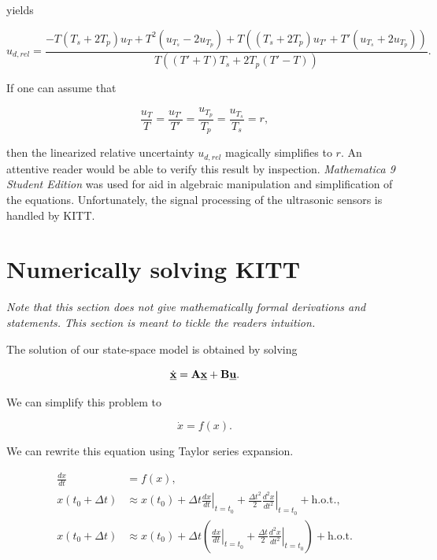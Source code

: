 \documentclass[11pt,titlepage]{report}
\begin{document}
\begin{appendices}
yields

\begin{equation}
	u_{d,rel} = \frac{
		-T(T_s + 2 T_p) u_T + T^2 (u_{T_s} - 2 u_{T_p}) + T \left( (T_s + 2 T_p) u_{T'} + T' (u_{T_s} + 2 u_{T_p}) \right)
	}{
		T \left( (T'+T)T_s + 2 T_p (T'-T) \right)
	}.
\end{equation}

If one can assume that

\begin{equation}
	\frac{u_T}{T} = \frac{u_{T'}}{T'} = \frac{u_{T_p}}{T_p} = \frac{u_{T_s}}{T_s}=r,
\end{equation}

then the linearized relative uncertainty $u_{d,rel}$ magically simplifies to $r$. An attentive reader would be able to verify this result by inspection. \textit{Mathematica 9 Student Edition} was used for aid in algebraic manipulation and simplification of the equations. Unfortunately, the signal processing of the ultrasonic sensors is handled by KITT.

\chapter{Numerically solving KITT}

\textit{Note that this section does not give mathematically formal derivations and statements. This section is meant to tickle the readers intuition.}

The solution of our state-space model is obtained by solving

\begin{equation}
	\dot{\mathbf{\underline{x}}}=\mathbf{A}\mathbf{\underline{x}}+\mathbf{B}\mathbf{\underline{u}}.
\end{equation}

We can simplify this problem to 

\begin{equation}
	\dot{x}=f(x).
\end{equation}

We can rewrite this equation using Taylor series expansion.

\begin{align}
	\frac{dx}{dt} &= f(x), \\
	x(t_0+\Delta t) &\approx
		x(t_0)+
		\left. \Delta t \frac{dx}{dt} \right|_{t=t_0}+
		\frac{\Delta t^2}{2}\left. \frac{d^2x}{dt^2} \right|_{t=t_0}+
		\text{h.o.t.}, \\
	x(t_0+\Delta t) &\approx
		x(t_0)+
		\Delta t \left(
			\left. \frac{dx}{dt} \right|_{t=t_0}+
			\frac{\Delta t}{2}\left. \frac{d^2x}{dt^2} \right|_{t=t_0}
		\right) + \text{h.o.t.} \label{eq:app-approx}
\end{align}


\end{appendices}
\end{document}
